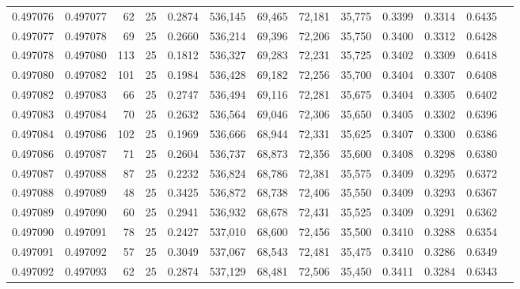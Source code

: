 \begin{tabular}{rrrrrrrrrrrrr}
0.497076 & 0.497077 &    62 &  25 &                                     0.2874 & 536,145 &  69,465 &  72,181 &  35,775 & 0.3399 & 0.3314 & 0.6435 \\
0.497077 & 0.497078 &    69 &  25 &                                     0.2660 & 536,214 &  69,396 &  72,206 &  35,750 & 0.3400 & 0.3312 & 0.6428 \\
0.497078 & 0.497080 &   113 &  25 &                                     0.1812 & 536,327 &  69,283 &  72,231 &  35,725 & 0.3402 & 0.3309 & 0.6418 \\
0.497080 & 0.497082 &   101 &  25 &                                     0.1984 & 536,428 &  69,182 &  72,256 &  35,700 & 0.3404 & 0.3307 & 0.6408 \\
0.497082 & 0.497083 &    66 &  25 &                                     0.2747 & 536,494 &  69,116 &  72,281 &  35,675 & 0.3404 & 0.3305 & 0.6402 \\
0.497083 & 0.497084 &    70 &  25 &                                     0.2632 & 536,564 &  69,046 &  72,306 &  35,650 & 0.3405 & 0.3302 & 0.6396 \\
0.497084 & 0.497086 &   102 &  25 &                                     0.1969 & 536,666 &  68,944 &  72,331 &  35,625 & 0.3407 & 0.3300 & 0.6386 \\
0.497086 & 0.497087 &    71 &  25 &                                     0.2604 & 536,737 &  68,873 &  72,356 &  35,600 & 0.3408 & 0.3298 & 0.6380 \\
0.497087 & 0.497088 &    87 &  25 &                                     0.2232 & 536,824 &  68,786 &  72,381 &  35,575 & 0.3409 & 0.3295 & 0.6372 \\
0.497088 & 0.497089 &    48 &  25 &                                     0.3425 & 536,872 &  68,738 &  72,406 &  35,550 & 0.3409 & 0.3293 & 0.6367 \\
0.497089 & 0.497090 &    60 &  25 &                                     0.2941 & 536,932 &  68,678 &  72,431 &  35,525 & 0.3409 & 0.3291 & 0.6362 \\
0.497090 & 0.497091 &    78 &  25 &                                     0.2427 & 537,010 &  68,600 &  72,456 &  35,500 & 0.3410 & 0.3288 & 0.6354 \\
0.497091 & 0.497092 &    57 &  25 &                                     0.3049 & 537,067 &  68,543 &  72,481 &  35,475 & 0.3410 & 0.3286 & 0.6349 \\
0.497092 & 0.497093 &    62 &  25 &                                     0.2874 & 537,129 &  68,481 &  72,506 &  35,450 & 0.3411 & 0.3284 & 0.6343 \\

\end{tabular}
